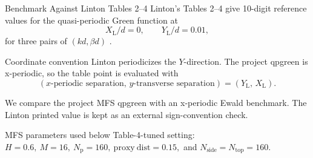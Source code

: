 \documentclass[aspectratio=169]{beamer}
\begin{document}
\begin{frame}{Benchmark Against Linton Tables 2--4}
  \scriptsize
  Linton's Tables 2--4 give 10-digit reference values for the
  quasi-periodic Green function at
  \[
    X_{\mathrm L}/d=0,\qquad Y_{\mathrm L}/d=0.01,
  \]
  for three pairs of \((kd,\beta d)\) \cite{Linton1998}.

  \begin{block}{Coordinate convention}
    Linton periodicizes the \(Y\)-direction.  The project qpgreen is
    x-periodic, so the table point is evaluated with
    \[
      (x\text{-periodic separation},\,y\text{-transverse separation})
      =
      (Y_{\mathrm L},\,X_{\mathrm L}).
    \]
  \end{block}

  We compare the project MFS qpgreen with an x-periodic Ewald benchmark.
  The Linton printed value is kept as an external sign-convention check.

  \begin{block}{MFS parameters used below}
    Table-4-tuned setting:
    \(H=0.6,\ M=16,\ N_{\mathrm p}=160,\ \mathrm{proxy\ dist}=0.15,\)
    and \(N_{\mathrm{side}}=N_{\mathrm{top}}=160\).
  \end{block}
\end{frame}
\end{document}
